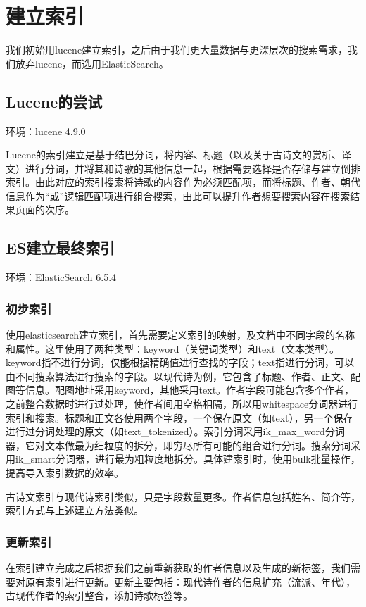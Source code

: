 \documentclass[a4paper, 10pt]{article}
\begin{document}
\section{建立索引}
我们初始用lucene建立索引，之后由于我们更大量数据与更深层次的搜索需求，我们放弃lucene，而选用ElasticSearch。

\subsection{Lucene的尝试}
环境：lucene 4.9.0

Lucene的索引建立是基于结巴分词，将内容、标题（以及关于古诗文的赏析、译文）进行分词，并将其和诗歌的其他信息一起，根据需要选择是否存储与建立倒排索引。由此对应的索引搜索将诗歌的内容作为必须匹配项，而将标题、作者、朝代信息作为“或”逻辑匹配项进行组合搜索，由此可以提升作者想要搜索内容在搜索结果页面的次序。

\subsection{ES建立最终索引}
环境：ElasticSearch 6.5.4

\subsubsection{初步索引}
使用elasticsearch建立索引，首先需要定义索引的映射，及文档中不同字段的名称和属性。这里使用了两种类型：keyword（关键词类型）和text（文本类型）。keyword指不进行分词，仅能根据精确值进行查找的字段；text指进行分词，可以由不同搜索算法进行搜索的字段。以现代诗为例，它包含了标题、作者、正文、配图等信息。配图地址采用keyword，其他采用text。作者字段可能包含多个作者，之前整合数据时进行过处理，使作者间用空格相隔，所以用whitespace分词器进行索引和搜索。标题和正文各使用两个字段，一个保存原文（如text），另一个保存进行过分词处理的原文（如text\_tokenized）。索引分词采用ik\_max\_word分词器，它对文本做最为细粒度的拆分，即穷尽所有可能的组合进行分词。搜索分词采用ik\_smart分词器，进行最为粗粒度地拆分。具体建索引时，使用bulk批量操作，提高导入索引数据的效率。

古诗文索引与现代诗索引类似，只是字段数量更多。作者信息包括姓名、简介等，索引方式与上述建立方法类似。

\subsubsection{更新索引}
在索引建立完成之后根据我们之前重新获取的作者信息以及生成的新标签，我们需要对原有索引进行更新。更新主要包括：现代诗作者的信息扩充（流派、年代），古现代作者的索引整合，添加诗歌标签等。
\end{document}
